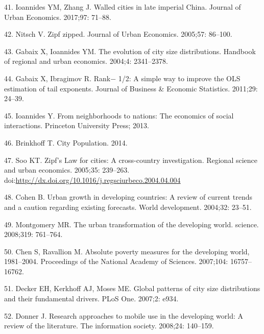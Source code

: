 \documentclass[10pt,letterpaper]{article}
\begin{document}
\leavevmode\hypertarget{ref-ioannides_walled_2017}{}%
41. Ioannides YM, Zhang J. Walled cities in late imperial China. Journal
of Urban Economics. 2017;97: 71--88.

\leavevmode\hypertarget{ref-nitsch_zipf_2005}{}%
42. Nitsch V. Zipf zipped. Journal of Urban Economics. 2005;57: 86--100.

\leavevmode\hypertarget{ref-gabaix_evolution_2004}{}%
43. Gabaix X, Ioannides YM. The evolution of city size distributions.
Handbook of regional and urban economics. 2004;4: 2341--2378.

\leavevmode\hypertarget{ref-gabaix_rank_2011}{}%
44. Gabaix X, Ibragimov R. Rank− 1/2: A simple way to improve the OLS
estimation of tail exponents. Journal of Business \& Economic
Statistics. 2011;29: 24--39.

\leavevmode\hypertarget{ref-ioannides2013neighborhoods}{}%
45. Ioannides Y. From neighborhoods to nations: The economics of social
interactions. Princeton University Press; 2013.

\leavevmode\hypertarget{ref-thomas_brinkhoff_city_2014}{}%
46. Brinkhoff T. City Population. 2014.

\leavevmode\hypertarget{ref-soo_zipfs_2005}{}%
47. Soo KT. Zipf's Law for cities: A cross-country investigation.
Regional science and urban economics. 2005;35: 239--263.
doi:\href{https://doi.org/http://dx.doi.org/10.1016/j.regsciurbeco.2004.04.004}{http://dx.doi.org/10.1016/j.regsciurbeco.2004.04.004}

\leavevmode\hypertarget{ref-cohen_urban_2004}{}%
48. Cohen B. Urban growth in developing countries: A review of current
trends and a caution regarding existing forecasts. World development.
2004;32: 23--51.

\leavevmode\hypertarget{ref-montgomery_urban_2008}{}%
49. Montgomery MR. The urban transformation of the developing world.
science. 2008;319: 761--764.

\leavevmode\hypertarget{ref-chen_absolute_2007}{}%
50. Chen S, Ravallion M. Absolute poverty measures for the developing
world, 1981--2004. Proceedings of the National Academy of Sciences.
2007;104: 16757--16762.

\leavevmode\hypertarget{ref-decker_global_2007}{}%
51. Decker EH, Kerkhoff AJ, Moses ME. Global patterns of city size
distributions and their fundamental drivers. PLoS One. 2007;2: e934.

\leavevmode\hypertarget{ref-donner_research_2008}{}%
52. Donner J. Research approaches to mobile use in the developing world:
A review of the literature. The information society. 2008;24: 140--159.
\end{document}
